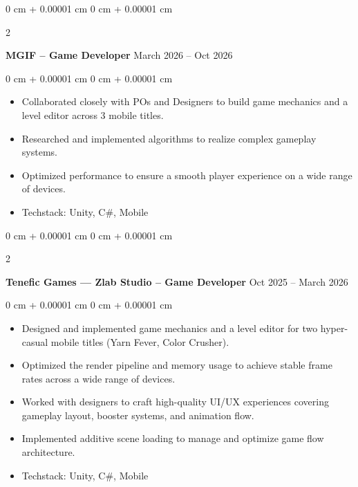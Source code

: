 \documentclass[10pt, letterpaper]{article}
\newenvironment{highlights}{
    \begin{itemize}[
        topsep=0.10 cm,
        parsep=0.10 cm,
        partopsep=0pt,
        itemsep=0pt,
        leftmargin=0 cm + 10pt
    ]
}{
    \end{itemize}
} %
\newenvironment{onecolentry}{
    \begin{adjustwidth}{
        0 cm + 0.00001 cm
    }{
        0 cm + 0.00001 cm
    }
}{
    \end{adjustwidth}
} %
\newenvironment{twocolentry}[2][]{
    \onecolentry
    \def\secondColumn{#2}
    \setcolumnwidth{\fill, 4.5 cm}
    \begin{paracol}{2}
}{
    \switchcolumn \raggedleft \secondColumn
    \end{paracol}
    \endonecolentry
} %
\begin{document}
        \begin{twocolentry}{
            March 2026 -- Oct 2026
        }
            \textbf{MGIF -- Game Developer}\end{twocolentry}
        \vspace{0.10 cm}
        \begin{onecolentry}
            \begin{highlights}
                \item Collaborated closely with POs and Designers to build game mechanics and a level editor across 3 mobile titles.
                \item Researched and implemented algorithms to realize complex gameplay systems.
                \item Optimized performance to ensure a smooth player experience on a wide range of devices.
                \item Techstack: Unity, C\#, Mobile
            \end{highlights}
        \end{onecolentry}

        \vspace{0.2 cm}

        \begin{twocolentry}{
            Oct 2025 -- March 2026
        }
            \textbf{Tenefic Games — Zlab Studio -- Game Developer}\end{twocolentry}
        \vspace{0.10 cm}
        \begin{onecolentry}
            \begin{highlights}
                \item Designed and implemented game mechanics and a level editor for two hyper-casual mobile titles (Yarn Fever, Color Crusher).
                \item Optimized the render pipeline and memory usage to achieve stable frame rates across a wide range of devices.
                \item Worked with designers to craft high-quality UI/UX experiences covering gameplay layout, booster systems, and animation flow.
                \item Implemented additive scene loading to manage and optimize game flow architecture.
                \item Techstack: Unity, C\#, Mobile
            \end{highlights}
        \end{onecolentry}
\end{document}
